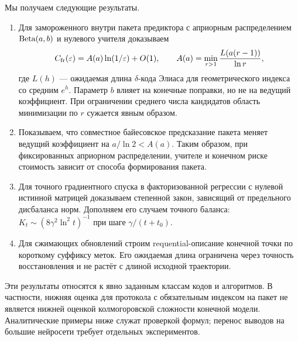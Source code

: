 Мы получаем следующие результаты.
\begin{enumerate}
\item Для замороженного внутри пакета предиктора с априорным распределением
$\operatorname{Beta}(a,b)$ и нулевого
учителя доказываем
\[
 C_{\rm fr}(\varepsilon)=A(a)\ln(1/\varepsilon)+O(1),\qquad
 A(a)=\min_{r>1}\frac{L(a(r-1))}{\ln r},
\]
где $L(h)$ --- ожидаемая длина $\delta$-кода Элиаса для геометрического индекса
со средним $e^h$. Параметр $b$ влияет на конечные поправки, но не на ведущий
коэффициент. При ограничении среднего числа кандидатов область минимизации
по $r$ сужается явным образом.
\item Показываем, что совместное байесовское предсказание пакета меняет ведущий
коэффициент на $a/\ln 2<A(a)$. Таким образом, при фиксированных априорном
распределении, учителе и конечном риске стоимость зависит от способа
формирования пакета.
\item Для точного градиентного спуска в факторизованной регрессии с нулевой
истинной матрицей доказываем степенной закон, зависящий от предельного
дисбаланса норм. Дополняем его случаем точного баланса:
$K_t\sim(8\gamma^2\ln^2t)^{-1}$ при шаге $\gamma/(t+t_0)$.
\item Для сжимающих обновлений строим requential-описание конечной точки по
короткому суффиксу меток. Его ожидаемая длина ограничена через точность
восстановления и не растёт с длиной исходной траектории.
\end{enumerate}

Эти результаты относятся к явно заданным классам кодов и алгоритмов. В
частности, нижняя оценка для протокола с обязательным индексом на пакет не
является нижней оценкой колмогоровской сложности конечной модели. Аналитические
примеры ниже служат проверкой формул; перенос выводов на большие нейросети
требует отдельных экспериментов.
